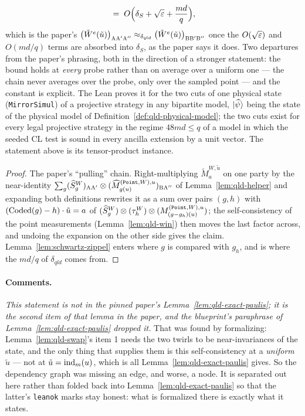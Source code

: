 \begin{lemma}
\begin{equation*}
  \;=\; O\Bigl( \delta_S + \sqrt{\varepsilon} + \frac{md}{q} \Bigr) ,
\end{equation*}
which is the paper's $\bigl( \tilde{W}^e(\tilde{u}) \bigr)_{\textsc{A} \textsc{A}' \textsc{A}''}
\approx_{\delta_{qld}} \bigl( \tilde{W}^e(\tilde{u}) \bigr)_{\textsc{B} \textsc{B}' \textsc{B}''}$ once the
$O(\sqrt{\varepsilon})$ and $O(md/q)$ terms are absorbed into $\delta_S$, as the paper says it
does. Two departures from the paper's phrasing, both in the direction of a stronger statement:
the bound holds at \emph{every} probe rather than on average over a uniform one --- the chain
never averages over the probe, only over the sampled point --- and the constant is explicit.
The Lean proves it for the two cuts of one physical state (\texttt{MirrorSimul}) of a projective
strategy in any bipartite model, $|\widehat\psi\rangle$ being the state of the physical model of
Definition~\ref{def:qld-physical-model}; the two cuts exist for every legal projective strategy in
the regime $48md \leq q$ of a model in which the seeded CL test is sound in every ancilla extension
by a unit vector. The statement above is its tensor-product instance.
\end{lemma}

\begin{proof}
\leanok
The paper's ``pulling'' chain. Right-multiplying $\tilde{M}^{W,\tilde{u}}_a$ on one party by the
near-identity $\sum_g (\widehat S^W_g)_{\textsc{A}\textsc{A}'} \otimes
(\widehat M^{(\mathtt{Point},W),u}_{g(u)})_{\textsc{B}\textsc{A}''}$ of Lemma~\ref{lem:qld-helper} and
expanding both definitions rewrites it as a sum over pairs $(g, h)$ with
$(\mathrm{Coded}(g) - h) \cdot \tilde{u} = a$ of $(\widehat S^W_g) \otimes (\tau^W_h) \otimes
(M^{(\mathtt{Point},W),u}_{(g - g_h)(u)})$; the self-consistency of the point measurements
(Lemma~\ref{lem:qld-win}) then moves the last factor across, and undoing the expansion on the
other side gives the claim. Lemma~\ref{lem:schwartz-zippel} enters where $g$ is compared with
$g_h$, and is where the $md/q$ of $\delta_{qld}$ comes from.
\end{proof}

\paragraph{Comments.} \emph{This statement is not in the pinned paper's
Lemma~\ref{lem:qld-exact-paulis}; it is the second item of that lemma in the paper, and the
blueprint's paraphrase of Lemma~\ref{lem:qld-exact-paulis} dropped it.} That was found by
formalizing: Lemma~\ref{lem:qld-swap}'s item 1 needs the two twirls to be near-invariances of the
state, and the only thing that supplies them is this self-consistency at a \emph{uniform}
$\tilde{u}$ --- not at $\tilde{u} = \mathrm{ind}_m(u)$, which is all
Lemma~\ref{lem:qld-exact-paulis} gives. So the dependency graph was missing an edge, and worse, a
node. It is separated out here rather than folded back into
Lemma~\ref{lem:qld-exact-paulis} so that the latter's \texttt{leanok} marks stay honest: what is
formalized there is exactly what it states.


